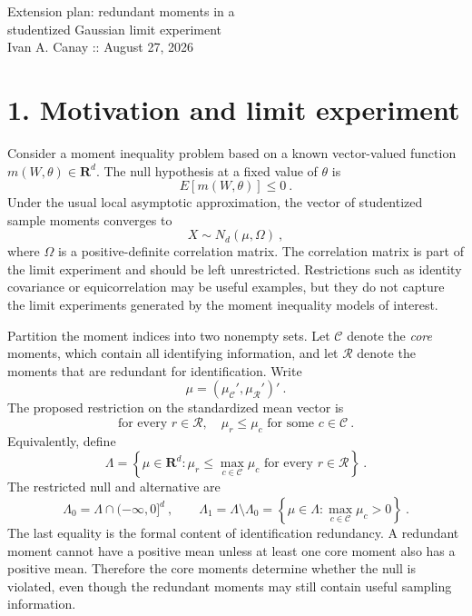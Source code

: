 \documentclass[12pt]{article}
\theoremstyle{remark}
\begin{document}
\begin{center}
{\Large Extension plan: redundant moments in a\\ studentized Gaussian limit experiment}\\[3pt]
{\small Ivan A. Canay :: August 27, 2026}
\end{center}

\medskip

\section*{1. Motivation and limit experiment}

Consider a moment inequality problem based on a known vector-valued function
$m(W,\theta)\in\mathbf R^d$.  The null hypothesis at a fixed value of $\theta$ is
\[
E[m(W,\theta)]\le0~.
\]
Under the usual local asymptotic approximation, the vector of studentized sample
moments converges to
\[
X\sim N_d(\mu,\Omega)~,
\]
where $\Omega$ is a positive-definite correlation matrix.  The correlation matrix is
part of the limit experiment and should be left unrestricted.  Restrictions such as
identity covariance or equicorrelation may be useful examples, but they do not capture
the limit experiments generated by the moment inequality models of interest.

Partition the moment indices into two nonempty sets.  Let $\mathcal C$ denote the
\emph{core} moments, which contain all identifying information, and let $\mathcal R$
denote the moments that are redundant for identification.  Write
\[
\mu=(\mu_{\mathcal C}',\mu_{\mathcal R}')'~.
\]
The proposed restriction on the standardized mean vector is
\begin{equation}\label{eq:redundancy}
\text{for every }r\in\mathcal R,\quad
\mu_r\le\mu_c\text{ for some }c\in\mathcal C~.
\end{equation}
Equivalently, define
\[
\Lambda
=
\left\{\mu\in\mathbf R^d:
\mu_r\le\max_{c\in\mathcal C}\mu_c
\text{ for every }r\in\mathcal R
\right\}~.
\]
The restricted null and alternative are
\[
\Lambda_0=\Lambda\cap(-\infty,0]^d~,
\qquad
\Lambda_1=\Lambda\setminus\Lambda_0
=
\left\{\mu\in\Lambda:
\max_{c\in\mathcal C}\mu_c>0
\right\}~.
\]
The last equality is the formal content of identification redundancy.  A redundant
moment cannot have a positive mean unless at least one core moment also has a positive
mean.  Therefore the core moments determine whether the null is violated, even though
the redundant moments may still contain useful sampling information.
\end{document}
